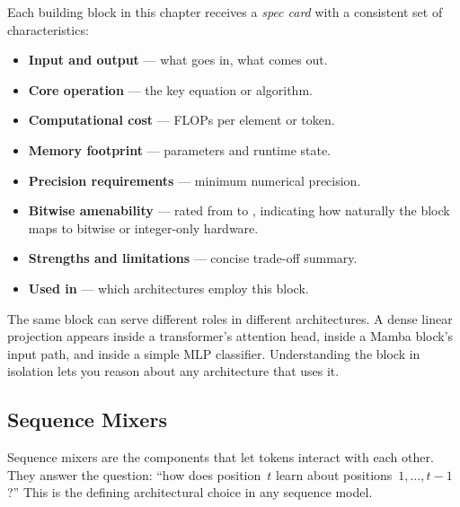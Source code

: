 Each building block in this chapter receives a \emph{spec card} with
a consistent set of characteristics:

\begin{itemize}[leftmargin=2em]
  \item \textbf{Input and output} --- what goes in, what comes out.
  \item \textbf{Core operation} --- the key equation or algorithm.
  \item \textbf{Computational cost} --- FLOPs per element or token.
  \item \textbf{Memory footprint} --- parameters and runtime state.
  \item \textbf{Precision requirements} --- minimum numerical precision.
  \item \textbf{Bitwise amenability} --- rated from  to
    , indicating how naturally the block maps to bitwise
    or integer-only hardware.
  \item \textbf{Strengths and limitations} --- concise trade-off summary.
  \item \textbf{Used in} --- which architectures employ this block.
\end{itemize}

The same block can serve different roles in different architectures.
A dense linear projection appears inside a transformer's attention
head, inside a Mamba block's input path, and inside a simple MLP
classifier. Understanding the block in isolation lets you reason about
any architecture that uses it.


\subsection{Sequence Mixers}
\label{sec:bb-sequence-mixers}

Sequence mixers are the components that let tokens interact with each
other. They answer the question: ``how does position~$t$ learn about
positions~$1, \ldots, t{-}1$?'' This is the defining architectural
choice in any sequence model.

